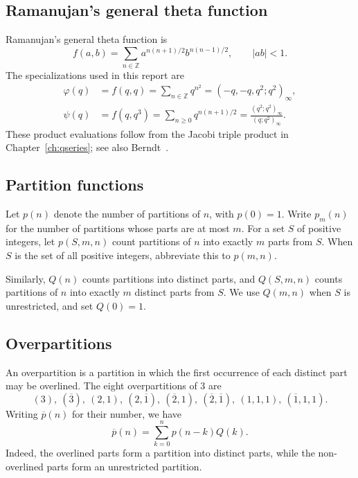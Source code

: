 \subsection{Ramanujan's general theta function}
Ramanujan's general theta function is
\begin{equation}
 f(a,b)=\sum_{n\in\mathbb Z}a^{n(n+1)/2}b^{n(n-1)/2},\qquad |ab|<1.
\end{equation}
The specializations used in this report are
\begin{align*}
 \varphi(q)&=f(q,q)=\sum_{n\in\mathbb Z}q^{n^2}
             =(-q,-q,q^2;q^2)_\infty,\\
 \psi(q)&=f(q,q^3)=\sum_{n\ge0}q^{n(n+1)/2}
             =\frac{(q^2;q^2)_\infty}{(q;q^2)_\infty}.
\end{align*}
These product evaluations follow from the Jacobi triple product in
Chapter~\ref{ch:qseries}; see also Berndt~\cite{berndt,berndt2}.

\subsection{Partition functions}
Let $p(n)$ denote the number of partitions of $n$, with $p(0)=1$.
Write $p_m(n)$ for the number of partitions whose parts are at most $m$.
For a set $S$ of positive integers, let $p(S,m,n)$ count partitions of $n$
into exactly $m$ parts from $S$. When $S$ is the set of all positive
integers, abbreviate this to $p(m,n)$.

Similarly, $Q(n)$ counts partitions into distinct parts, and $Q(S,m,n)$
counts partitions of $n$ into exactly $m$ distinct parts from $S$.
We use $Q(m,n)$ when $S$ is unrestricted, and set $Q(0)=1$.

\subsection{Overpartitions}
An overpartition is a partition in which the first occurrence of each
distinct part may be overlined. The eight overpartitions of $3$ are
\[
 (3),\ (\overline3),\ (2,1),\ (2,\overline1),\
 (\overline2,1),\ (\overline2,\overline1),\
 (1,1,1),\ (\overline1,1,1).
\]
Writing $\overline p(n)$ for their number, we have
\[
 \overline p(n)=\sum_{k=0}^n p(n-k)Q(k).
\]
Indeed, the overlined parts form a partition into distinct parts, while
the non-overlined parts form an unrestricted partition.

